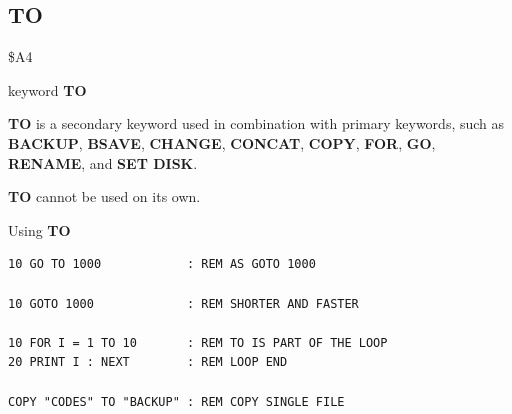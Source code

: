 
\newpage
\subsection{TO}
\begin{description}[leftmargin=2cm,style=nextline]
\item [Token:]    \$A4

\item [Format:]   keyword {\bf TO}

\item [Usage:]    {\bf TO} is a secondary keyword used in combination with primary key\-words, such as {\bf BACKUP}, {\bf BSAVE}, {\bf CHANGE}, {\bf CONCAT}, {\bf COPY}, {\bf FOR}, {\bf GO}, {\bf RENAME}, and {\bf SET DISK}.

\item [Remarks:]  {\bf TO} cannot be used on its own.

\item [Example:]  Using {\bf TO}

\begin{tcolorbox}[colback=black,coltext=white]
\verbatimfont{\codefont}
\begin{verbatim}
10 GO TO 1000            : REM AS GOTO 1000

10 GOTO 1000             : REM SHORTER AND FASTER

10 FOR I = 1 TO 10       : REM TO IS PART OF THE LOOP
20 PRINT I : NEXT        : REM LOOP END

COPY "CODES" TO "BACKUP" : REM COPY SINGLE FILE
\end{verbatim}
\end{tcolorbox}
\end{description}


\newpage
